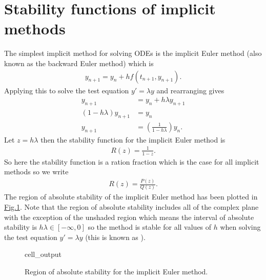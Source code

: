 \documentclass[letterpaper,10pt,english]{jupyterBook}
\begin{document}
\section{Stability functions of implicit methods}
\label{\detokenize{4_Stability/4.3_IRK_stability_function:stability-functions-of-implicit-methods}}\label{\detokenize{4_Stability/4.3_IRK_stability_function:implicit-rz-section}}\label{\detokenize{4_Stability/4.3_IRK_stability_function::doc}}
\sphinxAtStartPar
The simplest implicit method for solving ODEs is the implicit Euler method (also known as the backward Euler method) which is
\begin{align*}
    y_{n+1} =y_n + hf(t_{n+1}, y_{n+1}).
\end{align*}
\sphinxAtStartPar
Applying this to solve the test equation \(y' = \lambda y\) and rearranging gives
\begin{align*}
    y_{n+1} &=y_n + h \lambda y_{n+1} \\
    (1 - h\lambda ) y_{n+1} &=y_n \\
    y_{n+1} &=\left( \frac{1}{1 - h\lambda} \right) y_n.
\end{align*}
\sphinxAtStartPar
Let \(z = h\lambda\) then the stability function for the implicit Euler method is
\begin{align*}
    R(z)=\frac{1}{1-z}.
\end{align*}
\sphinxAtStartPar
So here the stability function is a ration fraction which is the case for all implicit methods so we write
\begin{align*}
    R(z) = \frac{P(z)}{Q(z)}.
\end{align*}
\sphinxAtStartPar
The region of absolute stability of the implicit Euler method has been plotted in \hyperref[\detokenize{4_Stability/4.3_IRK_stability_function:euler-stability-region-figure}]{Fig.\@ \ref{\detokenize{4_Stability/4.3_IRK_stability_function:euler-stability-region-figure}}}. Note that the region of absolute stability includes all of the complex plane with the exception of the unshaded region which means the interval of absolute stability is \(h\lambda \in [-\infty, 0]\) so the method is stable for all values of \(h\) when solving the test equation \(y'= \lambda y\) (this is known as {\hyperref[\detokenize{4_Stability/4.3_IRK_stability_function:a-stability-definition}]{}}).

\begin{figure}[htbp]
\centering
\capstart
\begin{sphinxVerbatimOutput}

\begin{sphinxuseclass}{cell_output}
\noindent{}

\end{sphinxuseclass}\end{sphinxVerbatimOutput}
\caption{Region of absolute stability for the implicit Euler method.}\label{\detokenize{4_Stability/4.3_IRK_stability_function:euler-stability-region-figure}}\end{figure}
\end{document}
